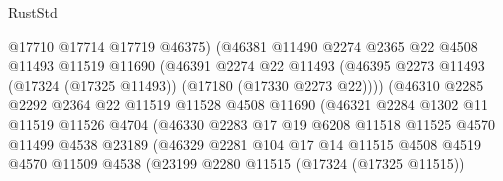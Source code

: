 \begin{lexlean}{RustStd}
\begin{coremodule}
{\begin{coremodule}
{{{{{{{{{{{{{{{{{{{{{{{{{{{{{{{{{{{{{{{{{{{{{{{{{{{{{{{                              @17710
                              @17714
                              @17719
                              @46375)
                            (@46381
                              @11490
                              @2274
                              @2365
                              @22
                              @4508
                              @11493
                              @11519
                              @11690
                              (@46391
                                @2274
                                @22
                                @11493
                                (@46395
                                  @2273
                                  @11493
                                  (@17324 (@17325 @11493))
                                  (@17180 (@17330 @2273 @22))))
                              (@46310
                                @2285
                                @2292
                                @2364
                                @22
                                @11519
                                @11528
                                @4508
                                @11690
                                (@46321
                                  @2284
                                  @1302
                                  @11
                                  @11519
                                  @11526
                                  @4704
                                  (@46330
                                    @2283
                                    @17
                                    @19
                                    @6208
                                    @11518
                                    @11525
                                    @4570
                                    @11499
                                    @4538
                                    @23189
                                    (@46329
                                      @2281
                                      @104
                                      @17
                                      @14
                                      @11515
                                      @4508
                                      @4519
                                      @4570
                                      @11509
                                      @4538
                                      (@23199
                                        @2280
                                        @11515
                                        (@17324 (@17325 @11515))
}}}}}}}}}}}}}}}}}}}}}}}}}}}}}}}}}}}}}}}}}}}}}}}}}}}}}}}
\end{coremodule}}
\end{coremodule}
\end{lexlean}
